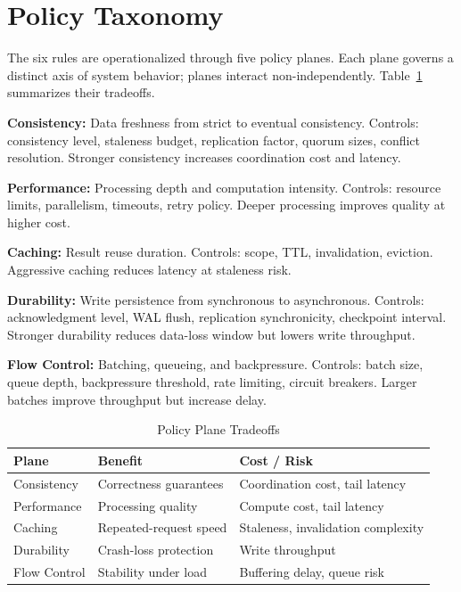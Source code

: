 \documentclass[conference]{IEEEtran}
\begin{document}
{\section{Policy Taxonomy}
\label{sec:taxonomy}
The six rules are operationalized through five policy planes. Each plane governs a distinct axis of system behavior; planes interact non-independently. Table~\ref{tab:planes} summarizes their tradeoffs.

{\color{red}
\textbf{Consistency:} Data freshness from strict to eventual consistency. Controls: consistency level, staleness budget, replication factor, quorum sizes, conflict resolution. Stronger consistency increases coordination cost and latency.}

{\color{red}
\textbf{Performance:} Processing depth and computation intensity. Controls: resource limits, parallelism, timeouts, retry policy. Deeper processing improves quality at higher cost.}

{\color{red}
\textbf{Caching:} Result reuse duration. Controls: scope, TTL, invalidation, eviction. Aggressive caching reduces latency at staleness risk.}

{\color{red}
\textbf{Durability:} Write persistence from synchronous to asynchronous. Controls: acknowledgment level, WAL flush, replication synchronicity, checkpoint interval. Stronger durability reduces data-loss window but lowers write throughput.}

{\color{red}
\textbf{Flow Control:} Batching, queueing, and backpressure. Controls: batch size, queue depth, backpressure threshold, rate limiting, circuit breakers. Larger batches improve throughput but increase delay.}

\begin{table}[t]
\caption{Policy Plane Tradeoffs}
\label{tab:planes}
\centering
\small
\begin{tabular}{@{}l l l@{}}
\toprule
\textbf{Plane} & \textbf{Benefit} & \textbf{Cost / Risk} \\
\midrule
Consistency & Correctness guarantees & Coordination cost, tail latency \\
Performance & Processing quality & Compute cost, tail latency \\
Caching & Repeated-request speed & Staleness, invalidation complexity \\
Durability & Crash-loss protection & Write throughput \\
Flow Control & Stability under load & Buffering delay, queue risk \\
\bottomrule
\end{tabular}
\end{table}

}
\end{document}
